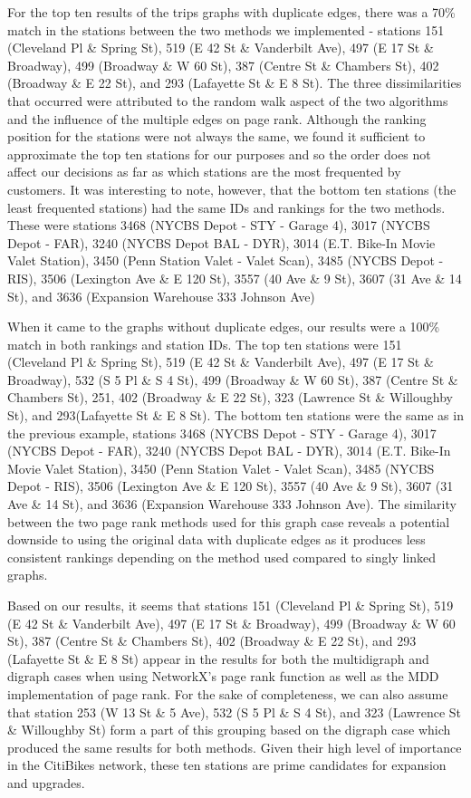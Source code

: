 \documentclass{article}
\begin{document}
	For the top ten results of the trips graphs with duplicate edges, there was a 70\% match in the stations between the two methods we implemented - stations 151 (Cleveland Pl \& Spring St), 519 (E 42 St \& Vanderbilt Ave), 497 (E 17 St \& Broadway), 499 (Broadway \& W 60 St), 387 (Centre St \& Chambers St), 402 (Broadway \& E 22 St), and 293 (Lafayette St \& E 8 St). The three dissimilarities that occurred were attributed to the random walk aspect of the two algorithms and the influence of the multiple edges on page rank. Although the ranking position for the stations were not always the same, we found it sufficient to approximate the top ten stations for our purposes and so the order does not affect our decisions as far as which stations are the most frequented by customers. It was interesting to note, however, that the bottom ten stations (the least frequented stations) had the same IDs and rankings for the two methods. These were stations 3468 (NYCBS Depot - STY - Garage 4), 3017 (NYCBS Depot - FAR), 3240 (NYCBS Depot BAL - DYR), 3014 (E.T. Bike-In Movie Valet Station), 3450 (Penn Station Valet - Valet Scan), 3485 (NYCBS Depot - RIS), 3506 (Lexington Ave \& E 120 St), 3557 (40 Ave \& 9 St), 3607 (31 Ave \& 14 St), and 3636 (Expansion Warehouse 333 Johnson Ave)
 \par
	When it came to the graphs without duplicate edges, our results were a 100\% match in both rankings and station IDs. The top ten stations were 151 (Cleveland Pl \& Spring St), 519 (E 42 St \& Vanderbilt Ave), 497 (E 17 St \& Broadway), 532 (S 5 Pl \& S 4 St), 499 (Broadway \& W 60 St), 387 (Centre St \& Chambers St), 251, 402 (Broadway \& E 22 St), 323 (Lawrence St \& Willoughby St), and 293(Lafayette St \& E 8 St). The bottom ten stations were the same as in the previous example, stations 3468 (NYCBS Depot - STY - Garage 4), 3017 (NYCBS Depot - FAR), 3240 (NYCBS Depot BAL - DYR), 3014 (E.T. Bike-In Movie Valet Station), 3450 (Penn Station Valet - Valet Scan), 3485 (NYCBS Depot - RIS), 3506 (Lexington Ave \& E 120 St), 3557 (40 Ave \& 9 St), 3607 (31 Ave \& 14 St), and 3636 (Expansion Warehouse 333 Johnson Ave). The similarity between the two page rank methods used for this graph case reveals a potential downside to using the original data with duplicate edges as it produces less consistent rankings depending on the method used compared to singly linked graphs. 
 \par
 Based on our results, it seems that stations 151 (Cleveland Pl \& Spring St), 519 (E 42 St \& Vanderbilt Ave), 497 (E 17 St \& Broadway), 499 (Broadway \& W 60 St), 387 (Centre St \& Chambers St), 402 (Broadway \& E 22 St), and 293 (Lafayette St \& E 8 St) appear in the results for both the multidigraph and digraph cases when using NetworkX’s page rank function as well as the MDD implementation of page rank. For the sake of completeness, we can also assume that station 253 (W 13 St \& 5 Ave), 532 (S 5 Pl \& S 4 St), and 323 (Lawrence St \& Willoughby St) form a part of this grouping based on the digraph case which produced the same results for both methods. Given their high level of importance in the CitiBikes network, these ten stations are prime candidates for expansion and upgrades. 
\end{document}
